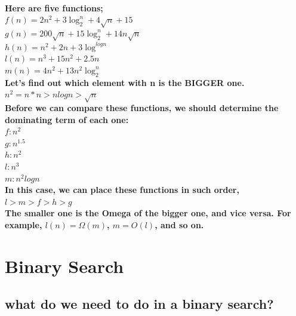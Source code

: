 \documentclass{article}
\begin{document}
\paragraph{Here are five functions;\\
$f(n)=2n^2 + 3\log_2^n + 4\sqrt{n} + 15$\\
$g(n)=200\sqrt{n} + 15\log_2^n + 14n\sqrt{n}$\\
$h(n)=n^2 + 2n + 3\log^{logn}$\\
$l(n)=n^3 + 15n^2 + 2.5n$\\
$m(n)=4n^2 + 13n^2\log_2^n$\\
Let's find out which element with n is the BIGGER one.\\
$n^2=n*n > nlogn > \sqrt{n}$\\
Before we can compare these functions, we should determine the dominating term of each one:\\
$f: n^2$\\
$g: n^{1.5}$\\
$h: n^2$\\
$l: n^3$\\
$m: n^2logn$\\
In this case, we can place these functions in such order,
$l > m > f > h > g$\\
The smaller one is the Omega of the bigger one, and vice versa.
For example, $l(n)=\Omega(m)$, $m=O(l)$, and so on.}


\newpage

\section{Binary Search}

\subsection{what do we need to do in a binary search?}
\end{document}
